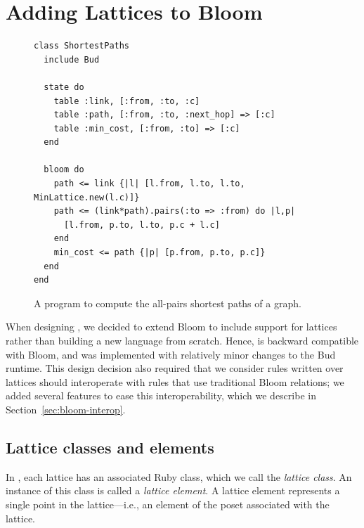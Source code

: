 \section{Adding Lattices to Bloom}
\label{sec:impl}

\begin{figure}[t]
\begin{scriptsize}
\begin{lstlisting}
class ShortestPaths
  include Bud

  state do
    table :link, [:from, :to, :c]
    table :path, [:from, :to, :next_hop] => [:c]
    table :min_cost, [:from, :to] => [:c]
  end

  bloom do
    path <= link {|l| [l.from, l.to, l.to, MinLattice.new(l.c)]}
    path <= (link*path).pairs(:to => :from) do |l,p|
      [l.from, p.to, l.to, p.c + l.c]
    end
    min_cost <= path {|p| [p.from, p.to, p.c]}
  end
end
\end{lstlisting}
\end{scriptsize}
\caption{A \lang program to compute the all-pairs shortest paths of a
  graph.}
\label{fig:lattice-spaths}
\end{figure}



When designing \lang, we decided to extend Bloom to include support for
lattices rather than building a new language from scratch. Hence, \lang is
backward compatible with Bloom, and was implemented with relatively minor
changes to the Bud runtime. This design decision also required that we consider
rules written over lattices should interoperate with rules that use traditional
Bloom relations; we added several \lang features to ease this interoperability,
which we describe in Section~\ref{sec:bloom-interop}.

\subsection{Lattice classes and elements}
In \lang, each lattice has an associated Ruby class, which we call the
\emph{lattice class}. An instance of this class is called a \emph{lattice
  element}. A lattice element represents a single point in the lattice---i.e., an
element of the poset associated with the lattice.

